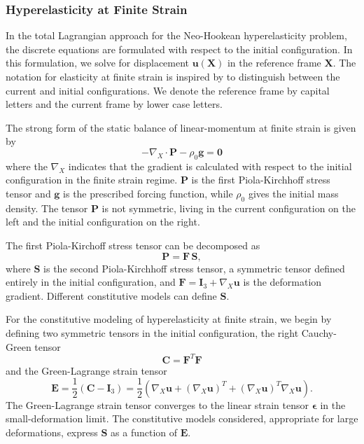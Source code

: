 \subsubsection{Hyperelasticity at Finite Strain}

In the total Lagrangian approach for the Neo-Hookean hyperelasticity problem, the discrete equations are formulated with respect to the initial configuration.
In this formulation, we solve for displacement $\mathbf u \left( \mathbf X \right)$ in the reference frame $\mathbf X$.
The notation for elasticity at finite strain is inspired by \cite{holzapfel2000nonlinear} to distinguish between the current and initial configurations.
We denote the reference frame by capital letters and the current frame by lower case letters.

The strong form of the static balance of linear-momentum at finite strain is given by
\begin{equation}
   - \nabla_X \cdot \mathbf{P} - \rho_0 \mathbf{g} = \mathbf{0}
   \label{eq:sblFinS}
\end{equation} 
where the $\nabla_X$ indicates that the gradient is calculated with respect to the initial configuration in the finite strain regime.
$\mathbf{P}$ is the first Piola-Kirchhoff stress tensor and $\mathbf{g}$ is the prescribed forcing function, while $\rho_0$ gives the initial mass density.
The tensor $\mathbf{P}$ is not symmetric, living in the current configuration on the left and the initial configuration on the right.

The first Piola-Kirchoff stress tensor can be decomposed as
\begin{equation}
   \mathbf{P} = \mathbf{F} \, \mathbf{S},
   \label{eq:1st2nd}
\end{equation}
where $\mathbf{S}$ is the second Piola-Kirchhoff stress tensor, a symmetric tensor defined entirely in the initial configuration, and $\mathbf{F} = \mathbf I_3 + \nabla_X \mathbf u$ is the deformation gradient.
Different constitutive models can define $\mathbf{S}$.

For the constitutive modeling of hyperelasticity at finite strain, we begin by defining two symmetric tensors in the initial configuration, the right Cauchy-Green tensor
\begin{equation}
\mathbf C = \mathbf F^T \mathbf F
\end{equation}
and the Green-Lagrange strain tensor
\begin{equation}
   \mathbf E = \frac 1 2 \left( \mathbf C - \mathbf I_3 \right) = \frac 1 2 \left( \nabla_X \mathbf u + \left( \nabla_X \mathbf u \right)^T + \left( \nabla_X \mathbf u \right)^T \nabla_X \mathbf u \right).
   \label{eq:green-lagrange-strain}
\end{equation}
The Green-Lagrange strain tensor converges to the linear strain tensor $\boldsymbol \epsilon$ in the small-deformation limit.
The constitutive models considered, appropriate for large deformations, express $\mathbf S$ as a function of $\mathbf E$.

